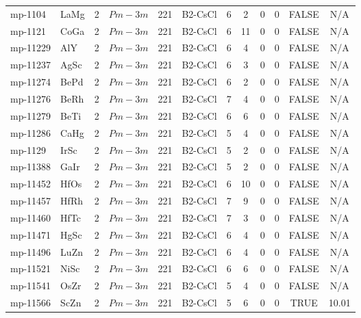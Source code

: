 {\begin{longtable}{llcccccccccc}
    mp-1104 & LaMg  & 2     & $Pm-3m$ & 221   & B2-CsCl & 6     & 2     & 0     & 0     & FALSE & N/A \\
    mp-1121 & CoGa  & 2     & $Pm-3m$ & 221   & B2-CsCl & 6     & 11    & 0     & 0     & FALSE & N/A \\
    mp-11229 & AlY   & 2     & $Pm-3m$ & 221   & B2-CsCl & 6     & 4     & 0     & 0     & FALSE & N/A \\
    mp-11237 & AgSc  & 2     & $Pm-3m$ & 221   & B2-CsCl & 6     & 3     & 0     & 0     & FALSE & N/A \\
    mp-11274 & BePd  & 2     & $Pm-3m$ & 221   & B2-CsCl & 6     & 2     & 0     & 0     & FALSE & N/A \\
    mp-11276 & BeRh  & 2     & $Pm-3m$ & 221   & B2-CsCl & 7     & 4     & 0     & 0     & FALSE & N/A \\
    mp-11279 & BeTi  & 2     & $Pm-3m$ & 221   & B2-CsCl & 6     & 6     & 0     & 0     & FALSE & N/A \\
    mp-11286 & CaHg  & 2     & $Pm-3m$ & 221   & B2-CsCl & 5     & 4     & 0     & 0     & FALSE & N/A \\
    mp-1129 & IrSc  & 2     & $Pm-3m$ & 221   & B2-CsCl & 5     & 2     & 0     & 0     & FALSE & N/A \\
    mp-11388 & GaIr  & 2     & $Pm-3m$ & 221   & B2-CsCl & 5     & 2     & 0     & 0     & FALSE & N/A \\
    mp-11452 & HfOs  & 2     & $Pm-3m$ & 221   & B2-CsCl & 6     & 10    & 0     & 0     & FALSE & N/A \\
    mp-11457 & HfRh  & 2     & $Pm-3m$ & 221   & B2-CsCl & 7     & 9     & 0     & 0     & FALSE & N/A \\
    mp-11460 & HfTc  & 2     & $Pm-3m$ & 221   & B2-CsCl & 7     & 3     & 0     & 0     & FALSE & N/A \\
    mp-11471 & HgSc  & 2     & $Pm-3m$ & 221   & B2-CsCl & 6     & 4     & 0     & 0     & FALSE & N/A \\
    mp-11496 & LuZn  & 2     & $Pm-3m$ & 221   & B2-CsCl & 6     & 4     & 0     & 0     & FALSE & N/A \\
    mp-11521 & NiSc  & 2     & $Pm-3m$ & 221   & B2-CsCl & 6     & 6     & 0     & 0     & FALSE & N/A \\
    mp-11541 & OsZr  & 2     & $Pm-3m$ & 221   & B2-CsCl & 5     & 4     & 0     & 0     & FALSE & N/A \\
    mp-11566 & ScZn  & 2     & $Pm-3m$ & 221   & B2-CsCl & 5     & 6     & 0     & 0     & TRUE  & 10.01  \\

\end{longtable}}
